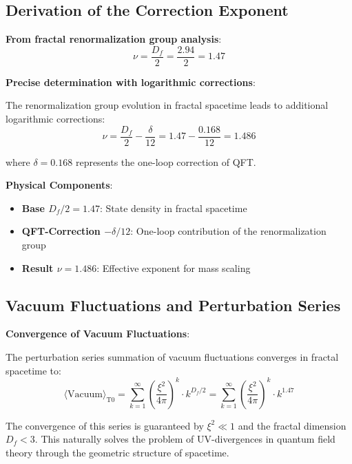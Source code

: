 \documentclass[12pt,a4paper]{article}
\newcommand{\nulep}{\nu}
\begin{document}
	\subsection{Derivation of the Correction Exponent}
	
	\textbf{From fractal renormalization group analysis}:
	\begin{equation}
		\nulep = \frac{D_f}{2} = \frac{2{.}94}{2} = 1{.}47
	\end{equation}
	
	\textbf{Precise determination with logarithmic corrections}:
	
	The renormalization group evolution in fractal spacetime leads to additional logarithmic corrections:
	\begin{equation}
		\nulep = \frac{D_f}{2} - \frac{\delta}{12} = 1{.}47 - \frac{0{.}168}{12} = 1{.}486
	\end{equation}
	
	where $\delta = 0{.}168$ represents the one-loop correction of QFT.
	
	\textbf{Physical Components}:
	\begin{itemize}
		\item \textbf{Base $D_f/2 = 1{.}47$}: State density in fractal spacetime
		\item \textbf{QFT-Correction $-\delta/12$}: One-loop contribution of the renormalization group
		\item \textbf{Result $\nulep = 1{.}486$}: Effective exponent for mass scaling
	\end{itemize}
	
	\subsection{Vacuum Fluctuations and Perturbation Series}
	
	\textbf{Convergence of Vacuum Fluctuations}:
	
	The perturbation series summation of vacuum fluctuations converges in fractal spacetime to:
	\begin{equation}
		\langle \text{Vacuum} \rangle_{\text{T0}} = \sum_{k=1}^{\infty} \left(\frac{\xi^2}{4\pi}\right)^k \cdot k^{D_f/2} = \sum_{k=1}^{\infty} \left(\frac{\xi^2}{4\pi}\right)^k \cdot k^{1{.}47}
	\end{equation}
	
	The convergence of this series is guaranteed by $\xi^2 \ll 1$ and the fractal dimension $D_f < 3$. This naturally solves the problem of UV-divergences in quantum field theory through the geometric structure of spacetime.
	
\end{document}
